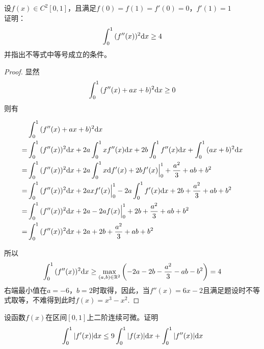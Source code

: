 \begin{proposition}

    设$f(x) \in C^2[0, 1]$，且满足$f(0) = f(1) = f'(0) = 0$，$f'(1) = 1$ \\
    证明：
    \[\int_{0}^{1}{(f''(x))^2}\mathrm{d} x \geq 4\]
    并指出不等式中等号成立的条件。

\end{proposition}

\begin{proof}

    显然
    \[\int_{0}^{1}{(f''(x) + ax + b)^2}\mathrm{d} x \geq 0\]
    则有

    \begin{align*}
        & \int_{0}^{1}{(f''(x) + ax + b)^2}\mathrm{d} x \\
        = & \int_{0}^{1}{(f''(x))^2}\mathrm{d} x + 2a \int_{0}^{1}{xf''(x)}\mathrm{d} x + 2b \int_{0}^{1}{f''(x)}\mathrm{d} x + \int_{0}^{1}{(ax + b)^2}\mathrm{d} x \\
        = & \int_{0}^{1}{(f''(x))^2}\mathrm{d} x + 2a \int_{0}^{1}{x}\mathrm{d} f'(x) + 2b f'(x) \Big|_{0}^{1} + \dfrac{a^2}{3} + ab + b^2 \\
        = & \int_{0}^{1}{(f''(x))^2}\mathrm{d} x + 2a xf'(x)\Big|_{0}^{1} - 2a \int_{0}^{1}{f'(x)}\mathrm{d} x + 2b + \dfrac{a^2}{3} + ab + b^2 \\
        = & \int_{0}^{1}{(f''(x))^2}\mathrm{d} x + 2a - 2af(x)\Big|_{0}^{1} + 2b + \dfrac{a^2}{3} + ab + b^2 \\
        = & \int_{0}^{1}{(f''(x))^2}\mathrm{d} x + 2a + 2b + \dfrac{a^2}{3} + ab + b^2
    \end{align*}

    所以
    \[\int_{0}^{1}{(f''(x))^2}\mathrm{d} x \geq \max_{(a, b) \in \mathbb{R}^2}\left( -2a - 2b - \dfrac{a^2}{3} - ab - b^2 \right) = 4\]
    右端最小值在$a = -6$，$b = 2$时取得，因此，当$f''(x) = 6x - 2$且满足题设时不等式取等，不难得到此时$f(x) = x^3 - x^2$.
    
\end{proof}

\begin{proposition}

    设函数$f(x)$在区间$[0, 1]$上二阶连续可微。证明
    \[\int_{0}^{1}{|f'(x)|}\mathrm{d} x \leq 9\int_{0}^{1}{|f(x)|}\mathrm{d} x + \int_{0}^{1}{|f''(x)|}\mathrm{d} x\]

\end{proposition}

